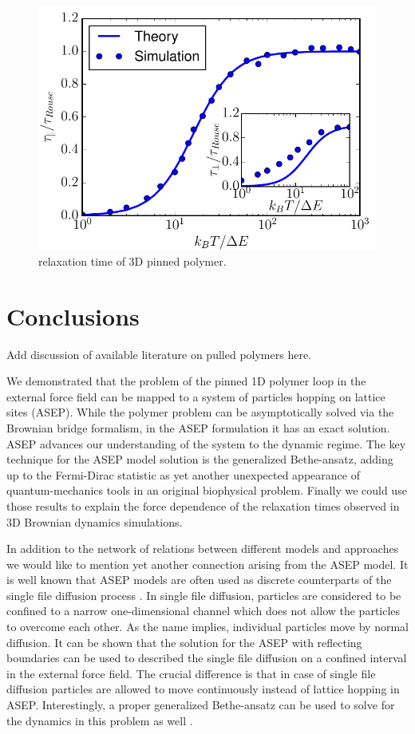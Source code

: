 \documentclass[aps,showpacs,twocolumn,floatfix,prx,superscriptaddress]{revtex4-1}
\begin{document}
\begin{figure}[htpb]
    \centering
    \includegraphics[width=1.0\linewidth]{relaxation3D}
    \caption{relaxation time of 3D pinned polymer.}
    \label{fig:relaxation3D}
\end{figure}
 
\section{Conclusions}
{\color{red}Add discussion of available literature on pulled polymers here.}

We demonstrated that the problem of the pinned 1D polymer loop in the external force field can be mapped to a system of particles hopping on lattice sites (ASEP). While the polymer problem can be asymptotically solved via the Brownian bridge formalism, in the ASEP formulation it has an exact solution. ASEP advances our understanding of the system to the dynamic regime. The key technique for the ASEP model solution is the generalized Bethe-ansatz, adding up to the Fermi-Dirac statistic as yet another unexpected appearance of quantum-mechanics tools in an original biophysical problem. Finally we could use those results to explain the force dependence of the relaxation times observed in 3D Brownian dynamics simulations.

In addition to the network of relations between different models and approaches we would like to mention yet another connection arising from the ASEP model. It is well known that ASEP models are often used as discrete counterparts of the single file diffusion process \cite{Lizana2008,Barkai2009}. In single file diffusion, particles are considered to be confined to a narrow one-dimensional channel which does not allow the particles to overcome each other. As the name implies, individual particles move by normal diffusion. It can be shown that the solution for the ASEP with reflecting boundaries can be used to described the single file diffusion on a confined interval in the external force field. The crucial difference is that in case of single file diffusion particles are allowed to move continuously instead of lattice hopping in ASEP. Interestingly, a proper generalized Bethe-ansatz can be used to solve for the dynamics in this problem as well \cite{Lizana2008}. 
\end{document}
